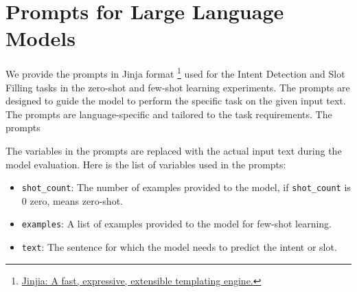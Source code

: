 
\newpage
\section{Prompts for Large Language Models}
\label{app:prompts}

We provide the prompts in Jinja format \footnote{\href{https://jinja.palletsprojects.com/en/stable/}{Jinjia: A fast, expressive, extensible templating engine.}} used for the Intent Detection and Slot Filling tasks in the zero-shot and few-shot learning experiments. The prompts are designed to guide the model to perform the specific task on the given input text. The prompts are language-specific and tailored to the task requirements. The prompts 

The variables in the prompts are replaced with the actual input text during the model evaluation. Here is the list of variables used in the prompts:

\begin{itemize}
    \item \texttt{shot\_count}: The number of examples provided to the model, if \texttt{shot\_count} is 0 zero, means zero-shot.
    \item \texttt{examples}: A list of examples provided to the model for few-shot learning.
    \item \texttt{text}: The sentence for which the model needs to predict the intent or slot.
\end{itemize}

